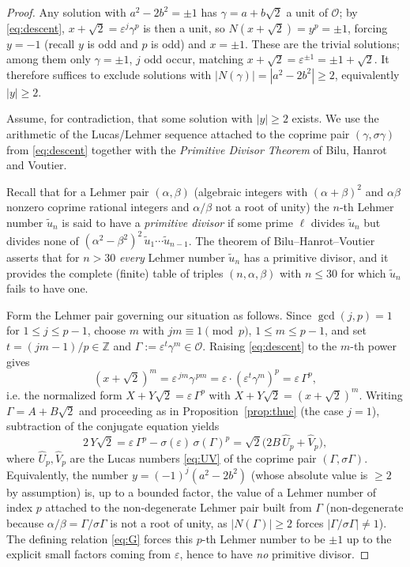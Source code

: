 \documentclass{amsart}
\theoremstyle{definition}
\begin{document}
\begin{proof}
Any solution with $a^2-2b^2=\pm1$ has $\gamma=a+b\sqrt2$ a unit of $\mathcal O$;
by \eqref{eq:descent}, $x+\sqrt2=\varepsilon^{j}\gamma^{p}$ is then a unit, so
$N(x+\sqrt2)=y^p=\pm1$, forcing $y=-1$ (recall $y$ is odd and $p$ is odd) and
$x=\pm1$. These are the trivial solutions; among them only $\gamma=\pm1$,
$j$ odd occur, matching $x+\sqrt2=\varepsilon^{\pm1}=\pm1+\sqrt2$. It therefore
suffices to exclude solutions with $|N(\gamma)|=|a^2-2b^2|\ge2$, equivalently
$|y|\ge2$.

Assume, for contradiction, that some solution with $|y|\ge2$ exists. We use the
arithmetic of the Lucas/Lehmer sequence attached to the coprime pair
$(\gamma,\sigma\gamma)$ from \eqref{eq:descent} together with the
\emph{Primitive Divisor Theorem} of Bilu, Hanrot and Voutier.

Recall that for a Lehmer pair $(\alpha,\beta)$ (algebraic integers with
$(\alpha+\beta)^2$ and $\alpha\beta$ nonzero coprime rational integers and
$\alpha/\beta$ not a root of unity) the $n$-th Lehmer number $\widetilde u_n$ is
said to have a \emph{primitive divisor} if some prime $\ell$ divides
$\widetilde u_n$ but divides none of
$(\alpha^2-\beta^2)^2\,\widetilde u_1\cdots\widetilde u_{n-1}$. The theorem of
Bilu--Hanrot--Voutier asserts that for $n>30$ \emph{every} Lehmer number
$\widetilde u_n$ has a primitive divisor, and it provides the complete (finite)
table of triples $(n,\alpha,\beta)$ with $n\le 30$ for which $\widetilde u_n$
fails to have one.

Form the Lehmer pair governing our situation as follows. Since
$\gcd(j,p)=1$ for $1\le j\le p-1$, choose $m$ with $jm\equiv1\pmod p$,
$1\le m\le p-1$, and set $t=(jm-1)/p\in\mathbb Z$ and
$\Gamma:=\varepsilon^{t}\gamma^{m}\in\mathcal O$. Raising \eqref{eq:descent} to
the $m$-th power gives
\[
(x+\sqrt2)^{m}=\varepsilon^{\,jm}\gamma^{\,pm}
=\varepsilon\cdot(\varepsilon^{t}\gamma^{m})^{p}=\varepsilon\,\Gamma^{p},
\]
i.e. the normalized form $X+Y\sqrt2=\varepsilon\,\Gamma^{p}$ with
$X+Y\sqrt2=(x+\sqrt2)^{m}$. Writing $\Gamma=A+B\sqrt2$ and proceeding as in
Proposition~\ref{prop:thue} (the case $j=1$), subtraction of the conjugate
equation yields
\[
2\,Y\sqrt2=\varepsilon\,\Gamma^{p}-\sigma(\varepsilon)\,\sigma(\Gamma)^{p}
=\sqrt2\Big(2B\,\widehat U_p+\widehat V_p\Big),
\]
where $\widehat U_p,\widehat V_p$ are the Lucas numbers \eqref{eq:UV} of the
coprime pair $(\Gamma,\sigma\Gamma)$. Equivalently, the number
$y=(-1)^j(a^2-2b^2)$ (whose absolute value is $\ge2$ by assumption) is, up to a
bounded factor, the value of a Lehmer number of index $p$ attached to the
non-degenerate Lehmer pair built from $\Gamma$ (non-degenerate because
$\alpha/\beta=\Gamma/\sigma\Gamma$ is not a root of unity, as $|N(\Gamma)|\ge2$
forces $|\Gamma/\sigma\Gamma|\ne1$). The defining relation \eqref{eq:G} forces
this $p$-th Lehmer number to be $\pm1$ up to the explicit small factors coming
from $\varepsilon$, hence to have \emph{no} primitive divisor.


\end{proof}
\end{document}
